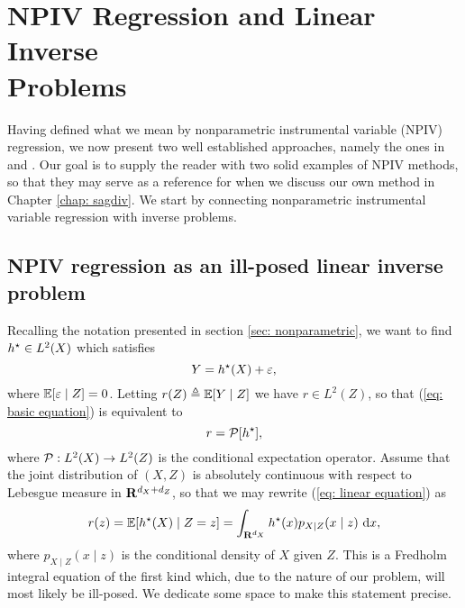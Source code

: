 \chapter{NPIV Regression and Linear Inverse \\Problems}
\label{chap: npiv and lip}

Having defined what we mean by nonparametric instrumental variable (NPIV) regression, we now present two well established approaches, namely the ones in \cite{darolles2011} and \cite{newey2003}.
Our goal is to supply the reader with two solid examples of NPIV methods, so that they may serve as a reference for when we discuss our own method in Chapter \ref{chap: sagdiv}.
We start by connecting nonparametric instrumental variable regression with inverse problems.

\section{NPIV regression as an ill-posed linear inverse problem}
\label{sec: npiv and ill posed lip}

Recalling the notation presented in section \ref{sec: nonparametric}, we want to find $ h^{ \star } \in L^{ 2 } ( X ) $ which satisfies
\begin{equation}
    \label{eq: basic equation}
    Y = h^{ \star } ( X ) + \varepsilon
,\end{equation}
where $ \mathbb{E} [ \varepsilon \mid Z ] = 0 $.
Letting $ r ( Z ) \triangleq \mathbb{E} [ Y \mid Z ] $ we have $ r \in L^{ 2 } ( Z ) $, so that (\ref{eq: basic equation}) is equivalent to
\begin{equation}
    \label{eq: linear equation}
    r = \mathcal{P} [ h^{ \star } ]
,\end{equation}
where $ \mathcal{P} : L^{ 2 } ( X ) \to L^{ 2 } ( Z ) $ is the conditional expectation operator.
Assume that the joint distribution of $ ( X, Z ) $ is absolutely continuous with respect to Lebesgue measure in $ \mathbf{R}^{ d_{ X } + d_{ Z } } $, so that we may rewrite (\ref{eq: linear equation}) as
\begin{equation}
    \label{eq: expectation equation}
    r ( z ) = \mathbb{E} [ h^{ \star } ( X ) \mid Z = z ] = \int_{ \mathbf{R}^{ d_{ X } } } h^{ \star } ( x ) p_{ X \mid Z } ( x \mid z ) \ \mathrm{d} x
,\end{equation}
where $ p_{ X\mid Z } ( x \mid z ) $ is the conditional density of $ X $ given $ Z $.
This is a Fredholm integral equation of the first kind \cite{kress89} which, due to the nature of our problem, will most likely be ill-posed.
We dedicate some space to make this statement precise.

